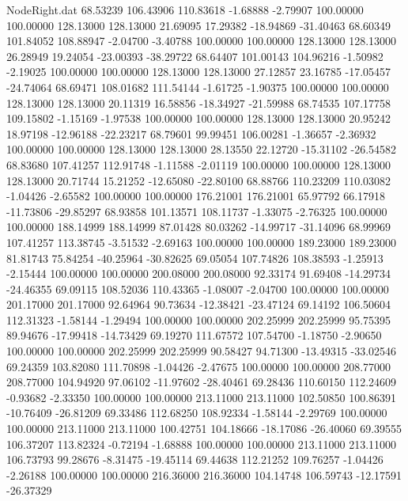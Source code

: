 \begin{filecontents}{NodeRight.dat}
  68.53239  106.43906  110.83618    -1.68888   -2.79907  100.00000  100.00000  128.13000  128.13000   21.69095   17.29382  -18.94869  -31.40463
  68.60349  101.84052  108.88947    -2.04700   -3.40788  100.00000  100.00000  128.13000  128.13000   26.28949   19.24054  -23.00393  -38.29722
  68.64407  101.00143  104.96216    -1.50982   -2.19025  100.00000  100.00000  128.13000  128.13000   27.12857   23.16785  -17.05457  -24.74064
  68.69471  108.01682  111.54144    -1.61725   -1.90375  100.00000  100.00000  128.13000  128.13000   20.11319   16.58856  -18.34927  -21.59988
  68.74535  107.17758  109.15802    -1.15169   -1.97538  100.00000  100.00000  128.13000  128.13000   20.95242   18.97198  -12.96188  -22.23217
  68.79601   99.99451  106.00281    -1.36657   -2.36932  100.00000  100.00000  128.13000  128.13000   28.13550   22.12720  -15.31102  -26.54582
  68.83680  107.41257  112.91748    -1.11588   -2.01119  100.00000  100.00000  128.13000  128.13000   20.71744   15.21252  -12.65080  -22.80100
  68.88766  110.23209  110.03082    -1.04426   -2.65582  100.00000  100.00000  176.21001  176.21001   65.97792   66.17918  -11.73806  -29.85297
  68.93858  101.13571  108.11737    -1.33075   -2.76325  100.00000  100.00000  188.14999  188.14999   87.01428   80.03262  -14.99717  -31.14096
  68.99969  107.41257  113.38745    -3.51532   -2.69163  100.00000  100.00000  189.23000  189.23000   81.81743   75.84254  -40.25964  -30.82625
  69.05054  107.74826  108.38593    -1.25913   -2.15444  100.00000  100.00000  200.08000  200.08000   92.33174   91.69408  -14.29734  -24.46355
  69.09115  108.52036  110.43365    -1.08007   -2.04700  100.00000  100.00000  201.17000  201.17000   92.64964   90.73634  -12.38421  -23.47124
  69.14192  106.50604  112.31323    -1.58144   -1.29494  100.00000  100.00000  202.25999  202.25999   95.75395   89.94676  -17.99418  -14.73429
  69.19270  111.67572  107.54700    -1.18750   -2.90650  100.00000  100.00000  202.25999  202.25999   90.58427   94.71300  -13.49315  -33.02546
  69.24359  103.82080  111.70898    -1.04426   -2.47675  100.00000  100.00000  208.77000  208.77000  104.94920   97.06102  -11.97602  -28.40461
  69.28436  110.60150  112.24609    -0.93682   -2.33350  100.00000  100.00000  213.11000  213.11000  102.50850  100.86391  -10.76409  -26.81209
  69.33486  112.68250  108.92334    -1.58144   -2.29769  100.00000  100.00000  213.11000  213.11000  100.42751  104.18666  -18.17086  -26.40060
  69.39555  106.37207  113.82324    -0.72194   -1.68888  100.00000  100.00000  213.11000  213.11000  106.73793   99.28676   -8.31475  -19.45114
  69.44638  112.21252  109.76257    -1.04426   -2.26188  100.00000  100.00000  216.36000  216.36000  104.14748  106.59743  -12.17591  -26.37329

\end{filecontents}

